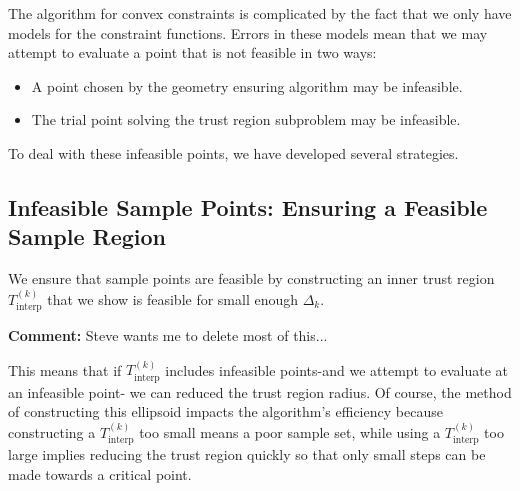 \documentclass{article}
\newenvironment{comment}
  {\par\medskip
   \color{red}%
   \begin{framed}
   \textbf{Comment: }\ignorespaces}
 {\end{framed}
  \medskip}
\theoremstyle{case}
\numberwithin{theorem}{subsection}
\newcommand{\dk}{\Delta_k}
\newcommand{\sampletrk}{{T_{\text{interp}}^{(k)}}}
\begin{document}
The algorithm for convex constraints is complicated by the fact that we only have models for the constraint functions.
Errors in these models mean that we may attempt to evaluate a point that is not feasible in two ways:
\begin{itemize}
\item A point chosen by the geometry ensuring algorithm may be infeasible.
\item The trial point solving the trust region subproblem may be infeasible.
\end{itemize}


To deal with these infeasible points, we have developed several strategies.

% 
% 
% 
% 
% 
% 


\subsection{Infeasible Sample Points: Ensuring a Feasible Sample Region}
\label{possible_ellipsoids}

We ensure that sample points are feasible by constructing an inner trust region $\sampletrk$ that we show is feasible for small enough $\dk$.
\begin{comment}
Steve wants me to delete most of this...
\end{comment}
This means that if $\sampletrk$ includes infeasible points-and we attempt to evaluate at an infeasible point- we can reduced the trust region radius.
Of course, the method of constructing this ellipsoid impacts the algorithm's efficiency because constructing a $\sampletrk$ too small means a poor sample set,
while using a $\sampletrk$ too large implies reducing the trust region quickly so that only small steps can be made towards a critical point.
\end{document}
